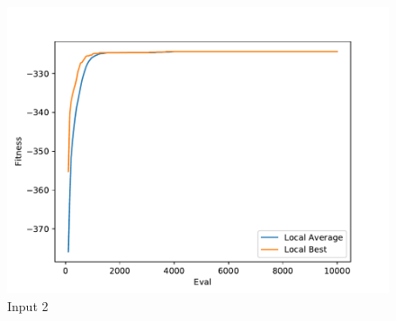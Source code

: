 \documentclass{standalone}
\begin{document}
\begin{figure}[!htb]
	\caption{Input 2}
	\label{fig:graph_2049}
	\includegraphics[width=\textwidth]{../graphs/graphs/2049.pdf}
\end{figure}
\end{document}

